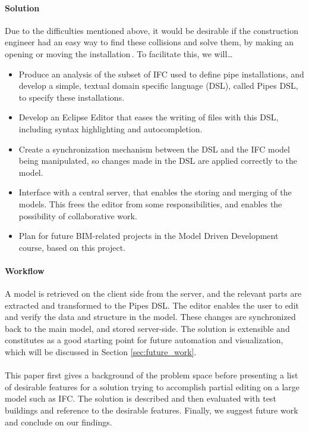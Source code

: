 \paragraph{Solution}
Due to the difficulties mentioned above, it would be desirable if the construction engineer had an easy way to find these collisions and solve them, by making an opening or moving the installation\,\cite{jorgensen12}. To facilitate this, we will…
\begin{itemize}
\item Produce an analysis of the subset of IFC used to define pipe installations, and develop a simple, textual domain specific language (DSL), called Pipes DSL, to specify these installations.
\item Develop an Eclipse Editor that eases the writing of files with this DSL, including syntax highlighting and autocompletion.
\item Create a synchronization mechanism between the DSL and the IFC model being manipulated, so changes made in the DSL are applied correctly to the model.
\item Interface with a central server, that enables the storing and merging of the models. This frees the editor from some responsibilities, and enables the possibility of collaborative work.
\item Plan for future BIM-related projects in the Model Driven Development course, based on this project.
\end{itemize}

\paragraph{Workflow}
\label{sec:workflow}
A model is retrieved on the client side from the server, and the relevant parts are extracted and transformed to the Pipes DSL. The editor enables the user to edit and verify the data and structure in the model. These changes are synchronized back to the main model, and stored server-side. The solution is extensible and constitutes as a good starting point for future automation and visualization, which will be discussed in Section \ref{sec:future_work}.

\paragraph{}
This paper first gives a background of the problem space before presenting a list of desirable features for a solution trying to accomplish partial editing on a large model such as IFC. The solution is described and then evaluated with test buildings and reference to the desirable features. Finally, we suggest future work and conclude on our findings.
